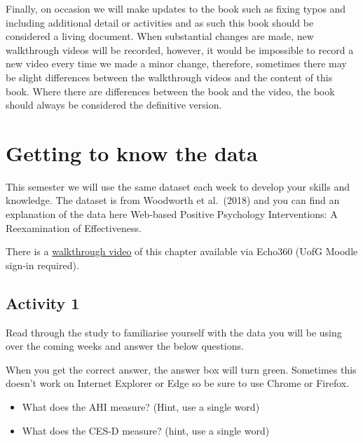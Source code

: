 \documentclass[
  oneside]{book}
\providecommand{\tightlist}{%
  \setlength{\itemsep}{0pt}\setlength{\parskip}{0pt}}
\begin{document}
Finally, on occasion we will make updates to the book such as fixing typos and including additional detail or activities and as such this book should be considered a living document. When substantial changes are made, new walkthrough videos will be recorded, however, it would be impossible to record a new video every time we made a minor change, therefore, sometimes there may be slight differences between the walkthrough videos and the content of this book. Where there are differences between the book and the video, the book should always be considered the definitive version.

\hypertarget{getting-to-know-the-data}{%
\chapter{Getting to know the data}\label{getting-to-know-the-data}}

This semester we will use the same dataset each week to develop your skills and knowledge. The dataset is from Woodworth et al.~(2018) and you can find an explanation of the data here Web-based Positive Psychology Interventions: A Reexamination of Effectiveness.

There is a \href{https://moodle.gla.ac.uk/filter/echo360/lti_launch.php?url=https\%3A\%2F\%2Fecho360.org.uk\%2Flti\%2F73750256-551c-47b5-9f1b-247567d647c2\%3FmediaId\%3Db75d33c3-4c7b-4586-b019-ee715f169409\%26autoplay\%3Dfalse\%26automute\%3Dfalse\&cmid=2529962\&width=640\&height=420}{walkthrough video} of this chapter available via Echo360 (UofG Moodle sign-in required).

\hypertarget{activity-1}{%
\section{Activity 1}\label{activity-1}}

Read through the study to familiarise yourself with the data you will be using over the coming weeks and answer the below questions.

When you get the correct answer, the answer box will turn green. Sometimes this doesn't work on Internet Explorer or Edge so be sure to use Chrome or Firefox.

\begin{itemize}
\tightlist
\item
  What does the AHI measure? (Hint, use a single word)
\end{itemize}

\begin{itemize}
\tightlist
\item
  What does the CES-D measure? (hint, use a single word)
\end{itemize}
\end{document}
